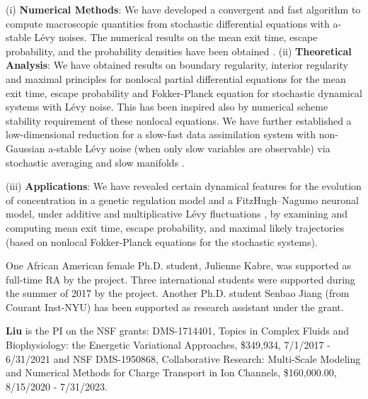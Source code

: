 \documentclass[11pt]{NSFamsart}
\begin{document}
 
(i)  \textbf{Numerical Methods}:
    We have developed a convergent and fast algorithm to compute macroscopic quantities from stochastic differential equations  with a-stable L\'evy noises. The numerical results on the mean   exit time, escape probability,  and the probability densities have been obtained \cite{ChenXL2020, GaoTing2016, Gao2016,     Wang2018NumericalAF}.
\noindent
(ii)  \textbf{Theoretical Analysis}:
We have obtained results on  boundary regularity, interior regularity and maximal principles for   nonlocal partial differential equations for the mean   exit time,   escape probability and Fokker-Planck equation for stochastic dynamical systems with L\'evy noise. This has been inspired also by numerical scheme stability requirement of these nonlocal equations. We have further established a  low-dimensional reduction for a slow-fast data assimilation system with non-Gaussian a-stable L\'evy noise (when only slow variables are observable) via stochastic averaging and slow manifolds \cite{Lv2016OnAS,QiaoDuan2018,   ZhangZhuanDuan,ZhengDuan2017,ZhengYY2020}.

\noindent
(iii)   \textbf{Applications}:
   We have revealed certain  dynamical features  for  the evolution of concentration in a genetic regulation model \cite{ChenWu} and a
   FitzHugh–Nagumo   neuronal model,   under additive and multiplicative     L\'evy fluctuations \cite{Liu2019LvyNI}, by examining and computing mean exit time, escape probability, and maximal likely trajectories (based on nonlocal Fokker-Planck equations for the stochastic systems).


 One African American female Ph.D. student, Julienne Kabre, was supported as full-time RA by the project. Three international students were supported during the summer of 2017 by the project.    Another Ph.D. student Senbao Jiang (from Courant Inst-NYU)  has been supported as research assistant under the grant. 
 
 
  



 \medskip 

\noindent\textbf{Liu} is the PI on the NSF grants: DMS-1714401,  Topics in Complex Fluids and Biophysiology: the Energetic Variational Approaches, \$349,934, 7/1/2017 - 6/31/2021 and 
{NSF DMS-1950868, Collaborative Research: Multi-Scale Modeling and Numerical Methods for Charge Transport in Ion Channels, \$160,000.00, 8/15/2020 - 7/31/2023.}
\end{document}
